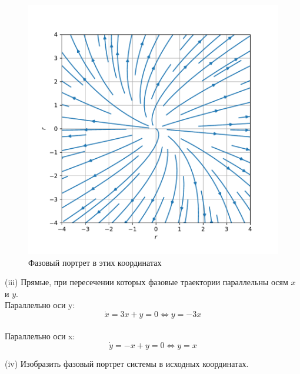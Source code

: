 \documentclass[a4paper, 12pt]{article}
\begin{document}
\begin{figure}[H]
	\centering
	\includegraphics[scale=0.8]{1b1_0}
	\caption{Фазовый портрет в этих координатах}
	\label{im:1b1_0}
\end{figure}


(iii) Прямые, при пересечении которых фазовые траектории параллельны осям $x$ и $y$.\\
Параллельно оси y:
\[\dot{x} = 3x+y=0\Leftrightarrow y = -3x\]\\
Параллельно оси x:
\[\dot{y} = -x+y=0\Leftrightarrow y = x\]

(iv) Изобразить фазовый портрет системы в исходных координатах.
\end{document}
